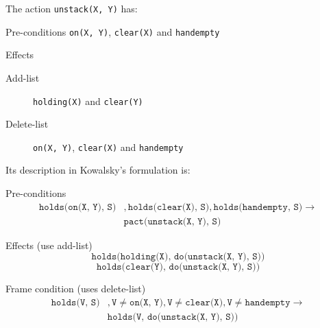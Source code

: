 \begin{example}
    The action \texttt{unstack(X, Y)} has:
    \begin{descriptionlist}
        \item[Pre-conditions] \texttt{on(X, Y)}, \texttt{clear(X)} and \texttt{handempty}
        \item[Effects] \phantom{}
        \begin{description}
            \item[Add-list] \texttt{holding(X)} and \texttt{clear(Y)}
            \item[Delete-list] \texttt{on(X, Y)}, \texttt{clear(X)} and \texttt{handempty}
        \end{description}
    \end{descriptionlist}

    Its description in Kowalsky's formulation is:
    \begin{descriptionlist}
        \item[Pre-conditions] 
            \[ 
                \begin{split}
                    \texttt{holds(on(X, Y), S)}&, \texttt{holds(clear(X), S)}, \texttt{holds(handempty, S)} \rightarrow \\
                    &\texttt{pact(unstack(X, Y), S)} 
                \end{split}
            \]
        
        \item[Effects] (use add-list)
            \[ \texttt{holds(holding(X), do(unstack(X, Y), S))} \]
            \[ \texttt{holds(clear(Y), do(unstack(X, Y), S))} \]
        
        \item[Frame condition] (uses delete-list)
            \[ 
                \begin{split}
                    \texttt{holds(V, S)}&, \texttt{V} \neq \texttt{on(X, Y)}, \texttt{V} \neq \texttt{clear(X)}, \texttt{V} \neq \texttt{handempty}
                    \rightarrow \\
                    & \texttt{holds(V, do(unstack(X, Y), S))}
                \end{split}
            \]
    \end{descriptionlist}
\end{example}



